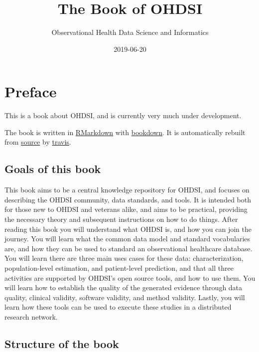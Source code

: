 \documentclass[11pt]{book}
\title{The Book of OHDSI}
\author{Observational Health Data Science and Informatics}
\date{2019-06-20}
\begin{document}
\maketitle

{
\setcounter{tocdepth}{1}
\tableofcontents
}
\chapter*{Preface}\label{preface}

 This is a book about OHDSI, and is currently very much under
development.

The book is written in \href{https://rmarkdown.rstudio.com}{RMarkdown}
with \href{https://bookdown.org}{bookdown}. It is automatically rebuilt
from \href{https://github.com/OHDSI/TheBookOfOhdsi}{source} by
\href{http://travis-ci.org/}{travis}.

\section*{Goals of this book}\label{goals-of-this-book}

This book aims to be a central knowledge repository for OHDSI, and
focuses on describing the OHDSI community, data standards, and tools. It
is intended both for those new to OHDSI and veterans alike, and aims to
be practical, providing the necessary theory and subsequent instructions
on how to do things. After reading this book you will understand what
OHDSI is, and how you can join the journey. You will learn what the
common data model and standard vocabularies are, and how they can be
used to standard an observational healthcare database. You will learn
there are three main uses cases for these data: characterization,
population-level estimation, and patient-level prediction, and that all
three activities are supported by OHDSI's open source tools, and how to
use them. You will learn how to establish the quality of the generated
evidence through data quality, clinical validity, software validity, and
method validity. Lastly, you will learn how these tools can be used to
execute these studies in a distributed research network.

\section*{Structure of the book}\label{structure-of-the-book}
\end{document}
